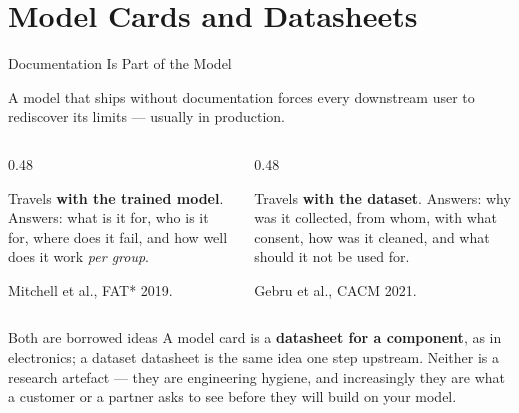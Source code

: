 \section{Model Cards and Datasheets}

\begin{frame}{Documentation Is Part of the Model}

    A model that ships without documentation forces every downstream user to rediscover its limits
    --- usually in production.

    \vspace{0.8em}

    \begin{columns}[T]
        \begin{column}{0.48\textwidth}
            \begin{tcolorbox}[colback=raiBlue!5, colframe=raiBlue!60, title=Model card]
                \small
                Travels \textbf{with the trained model}. Answers: what is it for, who is it for,
                where does it fail, and how well does it work \emph{per group}.

                \vspace{0.4em}
                Mitchell et al., FAT* 2019.
            \end{tcolorbox}
        \end{column}
        \begin{column}{0.48\textwidth}
            \begin{tcolorbox}[colback=raiGreen!5, colframe=raiGreen!60, title=Datasheet]
                \small
                Travels \textbf{with the dataset}. Answers: why was it collected, from whom, with
                what consent, how was it cleaned, and what should it not be used for.

                \vspace{0.4em}
                Gebru et al., CACM 2021.
            \end{tcolorbox}
        \end{column}
    \end{columns}

    \vspace{1em}

    \begin{block}{Both are borrowed ideas}
        \centering
        \small A model card is a \textbf{datasheet for a component}, as in electronics; a dataset
        datasheet is the same idea one step upstream. Neither is a research artefact --- they are
        engineering hygiene, and increasingly they are what a customer or a partner asks to see
        before they will build on your model.
    \end{block}
\end{frame}

